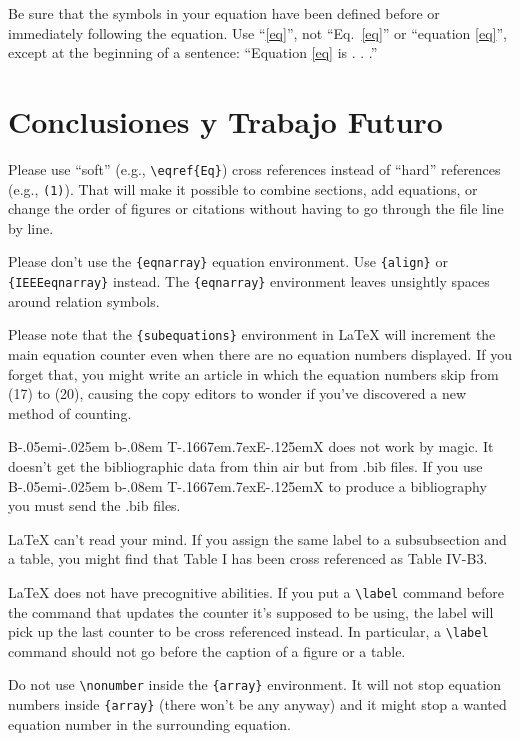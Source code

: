 \documentclass[conference]{IEEEtran}
\def\BibTeX{{\rm B\kern-.05em{\sc i\kern-.025em b}\kern-.08em
    T\kern-.1667em\lower.7ex\hbox{E}\kern-.125emX}}
\begin{document}
Be sure that the 
symbols in your equation have been defined before or immediately following 
the equation. Use ``\eqref{eq}'', not ``Eq.~\eqref{eq}'' or ``equation \eqref{eq}'', except at 
the beginning of a sentence: ``Equation \eqref{eq} is . . .''

\section{Conclusiones y Trabajo Futuro}

Please use ``soft'' (e.g., \verb|\eqref{Eq}|) cross references instead
of ``hard'' references (e.g., \verb|(1)|). That will make it possible
to combine sections, add equations, or change the order of figures or
citations without having to go through the file line by line.

Please don't use the \verb|{eqnarray}| equation environment. Use
\verb|{align}| or \verb|{IEEEeqnarray}| instead. The \verb|{eqnarray}|
environment leaves unsightly spaces around relation symbols.

Please note that the \verb|{subequations}| environment in {\LaTeX}
will increment the main equation counter even when there are no
equation numbers displayed. If you forget that, you might write an
article in which the equation numbers skip from (17) to (20), causing
the copy editors to wonder if you've discovered a new method of
counting.

{\BibTeX} does not work by magic. It doesn't get the bibliographic
data from thin air but from .bib files. If you use {\BibTeX} to produce a
bibliography you must send the .bib files. 

{\LaTeX} can't read your mind. If you assign the same label to a
subsubsection and a table, you might find that Table I has been cross
referenced as Table IV-B3. 

{\LaTeX} does not have precognitive abilities. If you put a
\verb|\label| command before the command that updates the counter it's
supposed to be using, the label will pick up the last counter to be
cross referenced instead. In particular, a \verb|\label| command
should not go before the caption of a figure or a table.

Do not use \verb|\nonumber| inside the \verb|{array}| environment. It
will not stop equation numbers inside \verb|{array}| (there won't be
any anyway) and it might stop a wanted equation number in the
surrounding equation.
\end{document}
